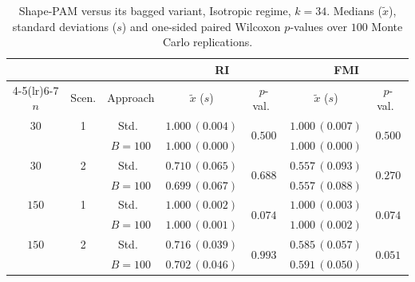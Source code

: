 \documentclass[11pt,a4paper]{article}
\begin{document}
\begin{table}[h]
\centering
\caption{Shape-PAM versus its bagged variant, Isotropic regime, $k=34$. Medians ($\tilde x$), standard deviations ($s$) and one-sided paired Wilcoxon $p$-values over $100$ Monte Carlo replications.}
\label{tab:pam-iso-k34}
\footnotesize
\begin{tabular}{cc c cc cc}
\toprule
& & & \multicolumn{2}{c}{\textbf{RI}} & \multicolumn{2}{c}{\textbf{FMI}} \\
\cmidrule(lr){4-5}\cmidrule(lr){6-7}
$n$ & Scen. & Approach & $\tilde x$ ($s$) & $p$-val.\ & $\tilde x$ ($s$) & $p$-val.\ \\
\midrule
$30$ & 1 & Std.\ & $1.000\,(0.004)$ & \multirow{2}{*}{$0.500$} & $1.000\,(0.007)$ & \multirow{2}{*}{$0.500$} \\
     &   & $B{=}100$ & $1.000\,(0.000)$ & & $1.000\,(0.000)$ & \\
$30$ & 2 & Std.\ & $0.710\,(0.065)$ & \multirow{2}{*}{$0.688$} & $0.557\,(0.093)$ & \multirow{2}{*}{$0.270$} \\
     &   & $B{=}100$ & $0.699\,(0.067)$ & & $0.557\,(0.088)$ & \\
$150$ & 1 & Std.\ & $1.000\,(0.002)$ & \multirow{2}{*}{$0.074$} & $1.000\,(0.003)$ & \multirow{2}{*}{$0.074$} \\
     &   & $B{=}100$ & $1.000\,(0.001)$ & & $1.000\,(0.002)$ & \\
$150$ & 2 & Std.\ & $0.716\,(0.039)$ & \multirow{2}{*}{$0.993$} & $0.585\,(0.057)$ & \multirow{2}{*}{$0.051$} \\
     &   & $B{=}100$ & $0.702\,(0.046)$ & & $0.591\,(0.050)$ & \\
\bottomrule
\end{tabular}
\end{table}
\end{document}

